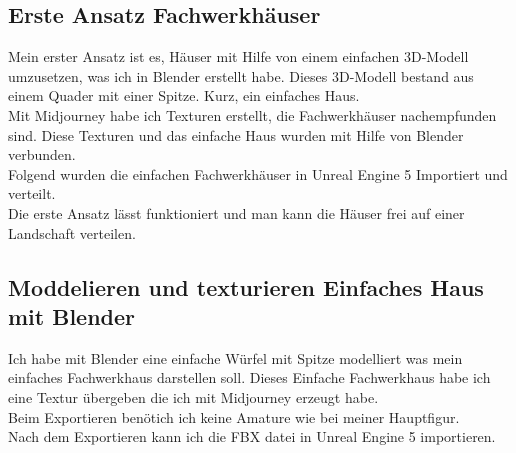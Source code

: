 \subsection{Erste Ansatz Fachwerkhäuser}%
Mein erster Ansatz ist es, Häuser mit Hilfe von einem einfachen 3D-Modell umzusetzen, was ich in Blender erstellt habe. Dieses 3D-Modell bestand aus einem Quader mit einer Spitze. Kurz, ein einfaches Haus.
\\
Mit Midjourney habe ich Texturen erstellt, die Fachwerkhäuser nachempfunden sind. Diese Texturen und das einfache Haus wurden mit Hilfe von Blender verbunden.
\\
Folgend wurden die einfachen Fachwerkhäuser in Unreal Engine 5 Importiert und verteilt.
\\
Die erste Ansatz lässt funktioniert und man kann die Häuser frei auf einer Landschaft verteilen.
\\
\subsection{Moddelieren und texturieren Einfaches Haus mit Blender}
Ich habe mit Blender eine einfache Würfel mit Spitze modelliert was mein einfaches Fachwerkhaus darstellen soll. Dieses Einfache Fachwerkhaus habe ich eine Textur übergeben die ich mit Midjourney erzeugt habe.
\\
Beim Exportieren benötich ich keine Amature wie bei meiner Hauptfigur.
\\
Nach dem Exportieren kann ich die FBX datei in Unreal Engine 5 importieren.

